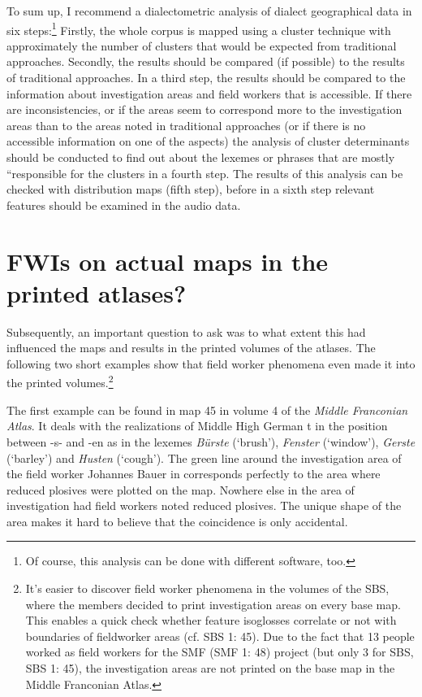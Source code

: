 \documentclass[output=paper]{LSP/langsci}
\begin{document}
To sum up, I recommend a dialectometric analysis of dialect geographical data in six steps:\footnote{Of course, this analysis can be done with different software, too.} Firstly, the whole corpus is mapped using a cluster technique with approximately the number of clusters that would be expected from traditional approaches. Secondly, the results should be compared (if possible) to the results of traditional approaches. In a third step, the results should be compared to the information about investigation areas and field workers that is accessible. If there are inconsistencies, or if the areas seem to correspond more to the investigation areas than to the areas noted in traditional approaches (or if there is no accessible information on one of the aspects) the analysis of cluster determinants should be conducted to find out about the lexemes or phrases that are mostly ``responsible{\textquotedbl} for the clusters in a fourth step. The results of this analysis can be checked with distribution maps (fifth step), before in a sixth step relevant features should be examined in the audio data.

\section{FWIs on actual maps in the printed atlases?}
Subsequently, an important question to ask was to what extent this had influenced the maps and results in the printed volumes of the atlases. The following two short examples show that field worker phenomena even made it into the printed volumes.\footnote{It's easier to discover field worker phenomena in the volumes of the SBS, where the members decided to print investigation areas on every base map. This enables a quick check whether feature isoglosses correlate or not with boundaries of fieldworker areas (cf. SBS 1: 45). Due to the fact that 13 people worked as field workers for the SMF (SMF 1: 48) project (but only 3 for SBS, SBS 1: 45), the investigation areas are not printed on the base map in the Middle Franconian Atlas.}

The first example can be found in map 45 in volume 4 of the \textit{Middle Franconian Atlas}. It deals with the realizations of Middle High German t in the position between -s- and -en as in the lexemes \textit{Bürste} (`brush'), \textit{Fenster} (`window'), \textit{Gerste} (`barley') and \textit{Husten} (`cough'). The green line around the investigation area of the field worker Johannes Bauer in  corresponds perfectly to the area where reduced plosives were plotted on the map. Nowhere else in the area of investigation had field workers noted reduced plosives. The unique shape of the area makes it hard to believe that the coincidence is only accidental.
\end{document}
